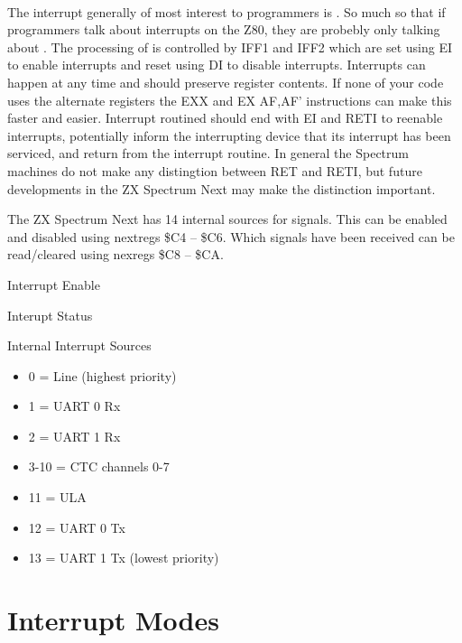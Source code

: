\paragraph{}
The interrupt generally of most interest to programmers is
. So much so that if programmers talk about
interrupts on the Z80, they are probebly only talking about
. The processing of  is controlled
by IFF1 and IFF2 which are set using EI to enable interrupts and reset
using DI to disable interrupts. Interrupts can happen at any time and
should preserve register contents.  If none of your code uses the
alternate registers the EXX and EX AF,AF’ instructions can make this
faster and easier. Interrupt routined should end with EI and RETI to
reenable interrupts, potentially inform the interrupting device that
its interrupt has been serviced, and return from the interrupt
routine. In general the Spectrum machines do not make any distingtion
between RET and RETI, but future developments in the ZX Spectrum Next
may make the distinction important.

The ZX Spectrum Next has 14 internal sources for 
signals. This can be enabled and disabled using nextregs \$C4 --
\$C6. Which signals have been received can be read/cleared using
nexregs \$C8 -- \$CA.

Interrupt Enable





Interupt Status





Internal Interrupt Sources
\begin{itemize}
\item[] 0 = Line (highest priority)
\item[] 1 = UART 0 Rx
\item[] 2 = UART 1 Rx
\item[] 3-10 = CTC channels 0-7
\item[] 11 = ULA
\item[] 12 = UART 0 Tx
\item[] 13 = UART 1 Tx (lowest priority)
\end{itemize}

\section{Interrupt Modes}
